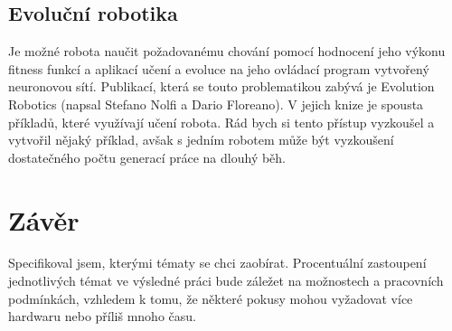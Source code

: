 \documentclass[11pt]{article}
\begin{document}
\subsection{Evoluční robotika}
Je možné robota naučit požadovanému chování pomocí hodnocení jeho výkonu
fitness funkcí a aplikací učení a evoluce na jeho ovládací program vytvořený
neuronovou sítí. Publikací, která se touto problematikou zabývá je Evolution
Robotics (napsal Stefano Nolfi a Dario Floreano). V jejich knize je spousta
příkladů, které využívají učení robota. Rád bych si tento přístup vyzkoušel a
vytvořil nějaký příklad, avšak s jedním robotem může být vyzkoušení
dostatečného počtu generací práce na dlouhý běh.

\section{Závěr}
Specifikoval jsem, kterými tématy se chci zaobírat. Procentuální zastoupení
jednotlivých témat ve výsledné práci bude záležet na možnostech a pracovních
podmínkách, vzhledem k tomu, že některé pokusy mohou vyžadovat více hardwaru
nebo příliš mnoho času.
\end{document}
